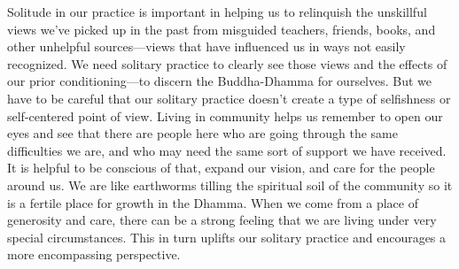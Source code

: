 Solitude in our practice is important in helping us to relinquish the 
unskillful views we've picked up in the past from misguided teachers, 
friends, books, and other unhelpful sources---views that have 
influenced us in ways not easily recognized. We need solitary practice 
to clearly see those views and the effects of our prior 
conditioning---to discern the Buddha-Dhamma for ourselves. But we have 
to be careful that our solitary practice doesn't create a type of 
selfishness or self-centered point of view. Living in community helps 
us remember to open our eyes and see that there are people here who are 
going through the same difficulties we are, and who may need the same 
sort of support we have received. It is helpful to be conscious of 
that, expand our vision, and care for the people around us. We are like 
earthworms tilling the spiritual soil of the community so it is a 
fertile place for growth in the Dhamma. When we come from a place of 
generosity and care, there can be a strong feeling that we are living 
under very special circumstances. This in turn uplifts our solitary 
practice and encourages a more encompassing perspective.

